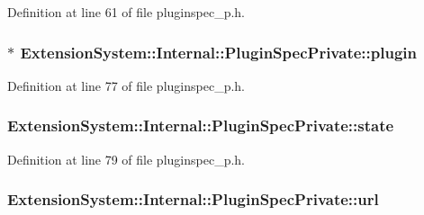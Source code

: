 \-Definition at line 61 of file pluginspec\-\_\-p.\-h.

\hypertarget{class_extension_system_1_1_internal_1_1_plugin_spec_private_a45c4fa79923c8d0624258b8f733125f1}{
\subsubsection[{plugin}]{$\ast$ {\bf \-Extension\-System\-::\-Internal\-::\-Plugin\-Spec\-Private\-::plugin}}}\label{class_extension_system_1_1_internal_1_1_plugin_spec_private_a45c4fa79923c8d0624258b8f733125f1}


\-Definition at line 77 of file pluginspec\-\_\-p.\-h.

\hypertarget{class_extension_system_1_1_internal_1_1_plugin_spec_private_a1806625ef956622e6727d0b0d50274aa}{
\subsubsection[{state}]{ {\bf \-Extension\-System\-::\-Internal\-::\-Plugin\-Spec\-Private\-::state}}}\label{class_extension_system_1_1_internal_1_1_plugin_spec_private_a1806625ef956622e6727d0b0d50274aa}


\-Definition at line 79 of file pluginspec\-\_\-p.\-h.

\hypertarget{class_extension_system_1_1_internal_1_1_plugin_spec_private_a6872e7bd6f42c91c16e3fcd03554f004}{
\subsubsection[{url}]{ {\bf \-Extension\-System\-::\-Internal\-::\-Plugin\-Spec\-Private\-::url}}}\label{class_extension_system_1_1_internal_1_1_plugin_spec_private_a6872e7bd6f42c91c16e3fcd03554f004}


